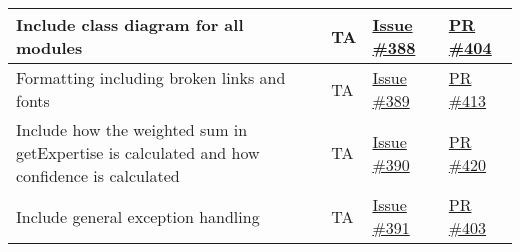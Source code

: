 \documentclass{article}
\begin{document}
\begin{longtable}{|p{5cm}|p{1.5cm}|p{2cm}|p{5cm}|}
Include class diagram for all modules & TA & \href{https://github.com/OKKM-insights/OKKM.insights/issues/388}{Issue \#388} & \href{https://github.com/OKKM-insights/OKKM.insights/pull/404}{PR \#404} \\ \hline
Formatting including broken links and fonts & TA & \href{https://github.com/OKKM-insights/OKKM.insights/issues/389}{Issue \#389} & \href{https://github.com/OKKM-insights/OKKM.insights/pull/413}{PR \#413} \\ \hline
Include how the weighted sum in getExpertise is calculated and how confidence is calculated & TA & \href{https://github.com/OKKM-insights/OKKM.insights/issues/390}{Issue \#390} & \href{https://github.com/OKKM-insights/OKKM.insights/pull/420}{PR \#420} \\ \hline
Include general exception handling & TA & \href{https://github.com/OKKM-insights/OKKM.insights/issues/391}{Issue \#391} & \href{https://github.com/OKKM-insights/OKKM.insights/pull/403}{PR \#403} \\ \hline
\end{longtable}
\end{document}
